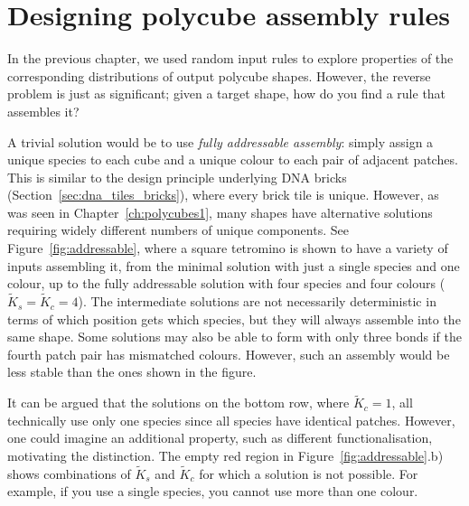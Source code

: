 \chapter{\label{ch:polycubes2}Designing polycube assembly rules}

\minitoc

In the previous chapter, we used random input rules to explore properties of the corresponding distributions of output polycube shapes. However, the reverse problem is just as significant; given a target shape, how do you find a rule that assembles it?  


A trivial solution would be to use \emph{fully addressable assembly}: simply assign a unique species to each cube and a unique colour to each pair of adjacent patches. This is similar to the design principle underlying DNA bricks (Section~\ref{sec:dna_tiles_bricks}), where every brick tile is unique. However, as was seen in Chapter~\ref{ch:polycubes1}, many shapes have alternative solutions requiring widely different numbers of unique components. See Figure~\ref{fig:addressable}, where a square tetromino is shown to have a variety of inputs assembling it, from the minimal solution with just a single species and one colour, up to the fully addressable solution with four species and four colours (\(\widetilde{K}_s = \widetilde{K}_c = 4\)). The intermediate solutions are not necessarily deterministic in terms of which position gets which species, but they will always assemble into the same shape. Some solutions may also be able to form with only three bonds if the fourth patch pair has mismatched colours. However, such an assembly would be less stable than the ones shown in the figure. 

It can be argued that the solutions on the bottom row, where \(\widetilde{K}_c=1\), all technically use only one species since all species have identical patches. However, one could imagine an additional property, such as different functionalisation, motivating the distinction. The empty red region in Figure~\ref{fig:addressable}.b) shows combinations of \(\widetilde{K}_s\) and \(\widetilde{K}_c\) for which a solution is not possible. For example, if you use a single species, you cannot use more than one colour.

